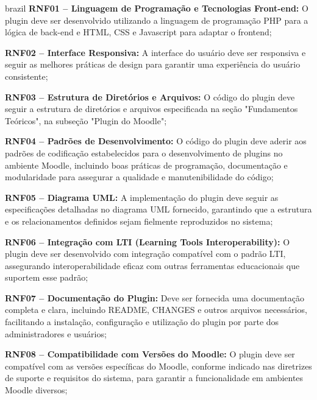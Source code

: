 \begin{otherlanguage*}{brazil}
\textbf{RNF01 – Linguagem de Programação e Tecnologias Front-end:} O plugin deve ser desenvolvido utilizando a linguagem de programação PHP para a lógica de back-end e HTML, CSS e Javascript para adaptar o frontend;

\vspace{12pt}

\textbf{RNF02 – Interface Responsiva:} A interface do usuário deve ser responsiva e seguir as melhores práticas de design para garantir uma experiência do usuário consistente;

\vspace{12pt}

\textbf{RNF03 – Estrutura de Diretórios e Arquivos:} O código do plugin deve seguir a estrutura de diretórios e arquivos especificada na seção "Fundamentos Teóricos", na subseção "Plugin do Moodle";

\vspace{12pt}

\textbf{RNF04 – Padrões de Desenvolvimento:} O código do plugin deve aderir aos padrões de codificação estabelecidos para o desenvolvimento de plugins no ambiente Moodle, incluindo boas práticas de programação, documentação e modularidade para assegurar a qualidade e manutenibilidade do código;

\vspace{12pt}

\textbf{RNF05 – Diagrama UML:} A implementação do plugin deve seguir as especificações detalhadas no diagrama UML fornecido, garantindo que a estrutura e os relacionamentos definidos sejam fielmente reproduzidos no sistema;

\vspace{12pt}

\textbf{RNF06 – Integração com LTI (Learning Tools Interoperability):} O plugin deve ser desenvolvido com integração compatível com o padrão LTI, assegurando interoperabilidade eficaz com outras ferramentas educacionais que suportem esse padrão;

\vspace{12pt}

\textbf{RNF07 – Documentação do Plugin:} Deve ser fornecida uma documentação completa e clara, incluindo README, CHANGES e outros arquivos necessários, facilitando a instalação, configuração e utilização do plugin por parte dos administradores e usuários;

\vspace{12pt}

\textbf{RNF08 – Compatibilidade com Versões do Moodle:} O plugin deve ser compatível com as versões específicas do Moodle, conforme indicado nas diretrizes de suporte e requisitos do sistema, para garantir a funcionalidade em ambientes Moodle diversos;


\end{otherlanguage*}
